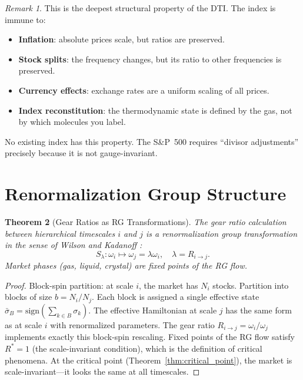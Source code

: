 \documentclass[twocolumn,10pt]{article}
\newtheorem{theorem}{Theorem}[section]
\theoremstyle{remark}
\newtheorem{remark}[theorem]{Remark}
\newcommand{\thmref}[1]{Theorem~\ref{#1}}
\begin{document}
\begin{remark}
This is the deepest structural property of the DTI.  The index is immune to:
\begin{itemize}
    \item \textbf{Inflation}: absolute prices scale, but ratios are preserved.
    \item \textbf{Stock splits}: the frequency changes, but its ratio to other frequencies is preserved.
    \item \textbf{Currency effects}: exchange rates are a uniform scaling of all prices.
    \item \textbf{Index reconstitution}: the thermodynamic state is defined by the gas, not by which molecules you label.
\end{itemize}
No existing index has this property.  The S\&P~500 requires ``divisor adjustments'' precisely because it is not gauge-invariant.
\end{remark}

\section{Renormalization Group Structure}
\label{sec:rg}

\begin{theorem}[Gear Ratios as RG Transformations]
\label{thm:rg}
The gear ratio calculation between hierarchical timescales $i$ and $j$ is a renormalization group transformation in the sense of Wilson \cite{wilson1971} and Kadanoff \cite{kadanoff1966}:
\begin{equation}
    S_\lambda : \omega_i \mapsto \omega_j = \lambda \omega_i, \quad \lambda = R_{i \to j}.
    \label{eq:rg_transform}
\end{equation}
Market phases (gas, liquid, crystal) are fixed points of the RG flow.
\end{theorem}

\begin{proof}
Block-spin partition: at scale $i$, the market has $N_i$ stocks.  Partition into blocks of size $b = N_i/N_j$.  Each block is assigned a single effective state $\bar{\sigma}_B = \mathrm{sign}(\sum_{k \in B} \sigma_k)$.  The effective Hamiltonian at scale $j$ has the same form as at scale $i$ with renormalized parameters.  The gear ratio $R_{i \to j} = \omega_i/\omega_j$ implements exactly this block-spin rescaling.  Fixed points of the RG flow satisfy $R^* = 1$ (the scale-invariant condition), which is the definition of critical phenomena.  At the critical point (\thmref{thm:critical_point}), the market is scale-invariant---it looks the same at all timescales.
\end{proof}
\end{document}

